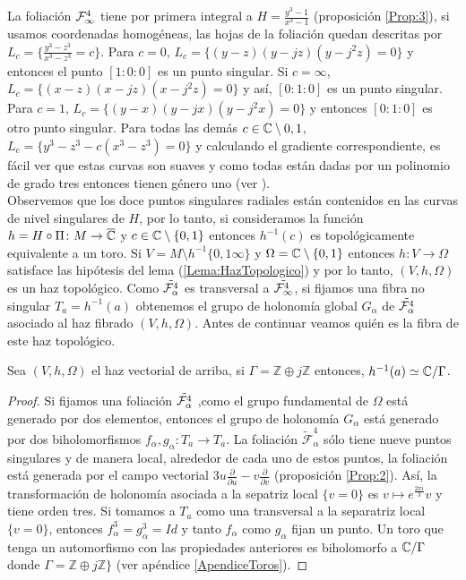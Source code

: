 La foliación $\Fol[4]{\infty}$ tiene por primera integral a $H=\tfrac{y^{3}-1}{x^{3}-1}$ (proposición \ref{Prop:3}), si usamos coordenadas homogéneas, las hojas de la foliación quedan descritas por $L_{c}=\{\tfrac{y^{3}-z^{3}}{x^{3}-z^{3}}=c\}$. Para $c=0$, $L_{c}=\{(y-z)(y-jz)(y-j^{2}z)=0\}$ y entonces el punto $[1:0:0]$ es un punto singular. Si $c=\infty$, $L_{c}=\{(x-z)(x-jz)(x-j^{2}z)=0\}$ y así, $[0:1:0]$ es un punto singular. Para $c=1$, $L_{c}=\{(y-x)(y-jx)(y-j^{2}x)=0\}$ y entonces $[0:1:0]$ es otro punto singular. Para todas las demás $c\in\C\setminus{0,1}$, $L_{c}=\{y^{3}-z^{3}-c(x^{3}-z^{3})=0\}$ y calculando el gradiente correspondiente, es fácil ver que estas curvas son suaves y como todas están dadas por un polinomio de grado tres entonces tienen género uno (ver \cite{FischerGerd}).\\

Observemos que los doce puntos singulares radiales están contenidos en las curvas de nivel singulares de $H$, por lo tanto, si consideramos la función $h=H\circ\Pi\colon M\rightarrow\overline{\C}$ y $c\in\C\setminus\{0,1\}$ entonces $h^{-1}(c)$ es topológicamente equivalente a un toro. Si $V=M\setminus h^{-1}\{0,1\infty\}$ y $\Omega=\C\setminus\{0,1\}$ entonces $h\colon V\rightarrow\Omega$ satisface las hipótesis del lema (\ref{Lema:HazTopologico}) y por lo tanto, $(V,h,\Omega)$ es un haz topológico. Como $\tilde{\Foli_{\alpha}^{4}}$ es transversal a $\tilde{\Foli_{\infty}^{4}}$, si fijamos una fibra no singular $T_{a}=h^{-1}(a)$ obtenemos el grupo de holonomía global $G_{\alpha}$ de $\tilde{\Foli_{\alpha}^{4}}$ asociado al haz fibrado $(V,h,\Omega)$. Antes de continuar veamos quién es la fibra de este haz topológico.
\begin{Proposicion}
\label{Prop:FibraDelHaz}
Sea $(V,h,\Omega)$ el haz vectorial de arriba, si $\Gamma=\mathbb{Z}\oplus j\mathbb{Z}$ entonces, $h^{-1}(a)\simeq\C/\Gamma$.
\end{Proposicion}
\begin{proof}
Si fijamos una foliación $\tilde{\Foli_{\alpha}^{4}}$ ,como el grupo fundamental de $\Omega$ está generado por dos elementos, entonces  el grupo de holonomía $G_{\alpha}$ está generado por dos biholomorfismos $f_{\alpha},g_{\alpha}\colon T_{a}\rightarrow T_{a}$. La foliación $\tilde{\mathcal{F}}_{\alpha}^{4}$ sólo tiene nueve puntos singulares y de manera local, alrededor de cada uno de estos puntos, la foliación está generada por el campo vectorial $3u\tfrac{\partial}{\partial u}-v\tfrac{\partial}{\partial v}$ (proposición \ref{Prop:2}). Así, la transformación de holonomía asociada a la sepatriz local $\{v=0\}$ es $v\mapsto e^{\tfrac{2\pi i}{3}}v$ y tiene orden tres. Si tomamos a $T_{a}$ como una transversal a la separatriz local $\{v=0\}$, entonces $f_{\alpha}^{3}=g_{\alpha}^{3}=Id$ y tanto $f_{\alpha}$ como $g_{\alpha}$ fijan un punto. Un toro que tenga un automorfismo con las propiedades anteriores es biholomorfo a $\C/\Gamma$ donde $\Gamma=\mathbb{Z}\oplus j\mathbb{Z} \}$ (ver apéndice \ref{ApendiceToros}).
\end{proof}

